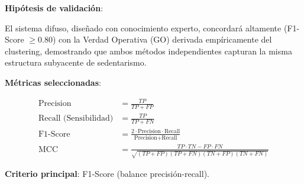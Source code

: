 \documentclass[12pt,letterpaper,twoside]{report}
\begin{document}
\begin{hipotesisbox}
\textbf{Hipótesis de validación}:

El sistema difuso, diseñado con conocimiento experto, concordará altamente (F1-Score $\geq 0.80$) con la Verdad Operativa (GO) derivada empíricamente del clustering, demostrando que ambos métodos independientes capturan la misma estructura subyacente de sedentarismo.
\end{hipotesisbox}

\begin{estadisticobox}
\textbf{Métricas seleccionadas}:

\begin{align}
\text{Precision} &= \frac{TP}{TP + FP} \\
\text{Recall (Sensibilidad)} &= \frac{TP}{TP + FN} \\
\text{F1-Score} &= \frac{2 \cdot \text{Precision} \cdot \text{Recall}}{\text{Precision} + \text{Recall}} \\
\text{MCC} &= \frac{TP \cdot TN - FP \cdot FN}{\sqrt{(TP+FP)(TP+FN)(TN+FP)(TN+FN)}}
\end{align}

\textbf{Criterio principal}: F1-Score (balance precisión-recall).
\end{estadisticobox}
\end{document}
